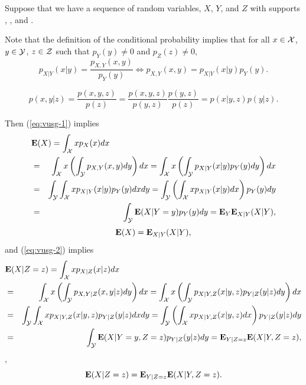 Suppose that we have a sequence of random variables, $X$, $Y$, and $Z$
with supports \suppx, \suppy, and \suppz.

Note that the definition of the conditional probability implies that
for all $x\in\mathcal{X}$, $y\in\mathcal{Y}$, $z\in\mathcal{Z}$ such that $p_Y(y)\neq0$ and $p_Z(z)\neq 0$,
\begin{equation}
\label{eq:vusg-1}
p_{X|Y}(x|y)
= \frac{p_{X,Y}(x,y)}{p_Y(y)}
\Leftrightarrow
p_{X,Y}(x,y) = p_{X|Y}(x|y) p_Y(y).
\end{equation}


\begin{equation}
\label{eq:vusg-2}
p(x,y|z)
= \frac{p(x,y,z)}{p(z)}
= \frac{p(x,y,z)}{p(y,z)} \frac{p(y,z)}{p(z)}
= p(x|y,z) p(y|z).
\end{equation}

Then (\ref{eq:vusg-1}) implies
\begin{eqnarray*}
\lefteqn{
\Expect(X)
= \int_\suppx x p_X(x) dx
}
\\
&=& \int_\suppx x \left(\int_\suppy p_{X,Y}(x,y) dy \right) dx
= \int_\suppx x \left(\int_\suppy p_{X|Y}(x|y)p_Y(y) dy \right) dx
\\
&=& \int_\suppy \int_\suppx x p_{X|Y}(x|y)p_Y(y) dx dy
= \int_\suppy \left( \int_\suppx x p_{X|Y}(x|y) dx \right) p_Y(y) dy
\\
&=& \int_\suppy \Expect (X|Y=y) p_Y(y) dy
= \Expect_Y \Expect_{X|Y} (X|Y),
\end{eqnarray*}
\begin{equation}
\mathbf{E}(X) = \mathbf{E}_{X|Y} (X|Y),
\end{equation}
and (\ref{eq:vusg-2}) implies
\begin{eqnarray*}
\lefteqn{
\Expect(X|Z=z)
= \int_\suppx x p_{X|Z}(x|z) dx
}
\\
&=& \int_\suppx x \left(\int_{\suppy} p_{X,Y|Z}(x,y|z) dy \right) dx
= \int_\suppx x \left(\int_{\suppy} p_{X|Y,Z}(x|y,z) p_{Y|Z}(y|z) dy \right) dx
\\
&=& \int_\suppy \int_\suppx x p_{X|Y,Z}(x|y,z) p_{Y|Z}(y|z) dx dy
= \int_\suppy \left( \int_\suppx x p_{X|Y,Z}(x|y,z) dx \right) p_{Y|Z}(y|z) dy
\\
&=& \int_\suppy \Expect(X|Y=y,Z=z) p_{Y|Z}(y|z) dy
= \Expect_{Y|Z=z} \Expect(X|Y,Z=z),
\end{eqnarray*}
\ie,
\begin{equation}
\label{eq:dkci}
\mathbf{E}(X|Z=z)
= \mathbf{E}_{Y|Z=z} \mathbf{E}(X|Y,Z=z).
\end{equation}
